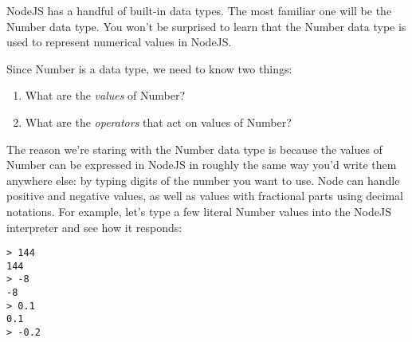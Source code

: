 NodeJS has a handful of built-in data types. The most familiar one will be the
\textsf{Number} data type. You won't be surprised to learn that the
\textsf{Number} data type is used to represent numerical values in NodeJS.

Since \textsf{Number} is a data type, we need to know two things:
\begin{enumerate}
  \item What are the \emph{values} of \textsf{Number}?
  \item What are the \emph{operators} that act on values of \textsf{Number}?
\end{enumerate}

The reason we're staring with the \textsf{Number} data type is because the
values of \textsf{Number} can be expressed in NodeJS in roughly the same way
you'd write them anywhere else: by typing digits of the number you want to use.
Node can handle positive and negative values, as well as values with fractional
parts using decimal notations. For example, let's type a few literal
\textsf{Number} values into the NodeJS interpreter and see how it responds:


\suppresslinenumbers
\begin{lstlisting}
> 144
144
> -8
-8
> 0.1
0.1
> -0.2
\end{lstlisting}
\reactivatelinenumbers


